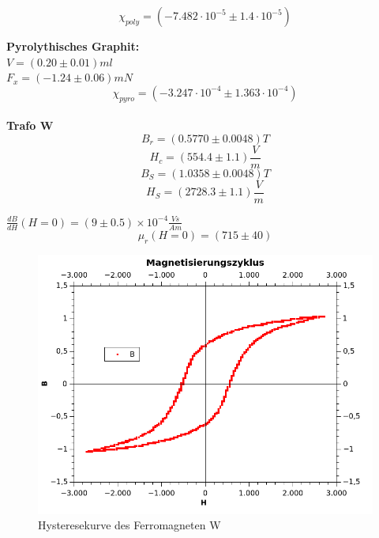 \documentclass[12pt,a4paper]{article}
\begin{document}
\begin{multicols}{2}
$$\chi_{poly} = (-7.482 \cdot 10^{-5} \pm 1.4 \cdot 10^{-5})$$

\textbf{Pyrolythisches Graphit:}\\
$V=(0.20 \pm 0.01) ml$\\
$F_x=(-1.24 \pm 0.06)mN$
$$\chi_{pyro} = (-3.247 \cdot 10^{-4} \pm 1.363 \cdot 10^{-4})$$
\\
\noindent
\textbf{Trafo W}\\
$$B_r = (0.5770 \pm 0.0048)T$$
$$H_c = (554.4 \pm 1.1)\frac{V}{m}$$
$$B_S = (1.0358 \pm 0.0048)T$$
$$H_S = (2728.3 \pm 1.1)\frac{V}{m}$$

$\frac{dB}{dH}(H=0)=(9 \pm 0.5)\times 10^{-4}\frac{Vs}{Am}$\\
$$\mu_r(H=0) =(715 \pm 40)$$




\end{multicols}
\begin{figure}[H]
	\centering
	\includegraphics[scale=1]{./figures/Trafo_W_Hysterese.png}
	\caption{Hysteresekurve des Ferromagneten W}
	\label{fig:Trafo_W_Hysterese}
\end{figure}
\end{document}
